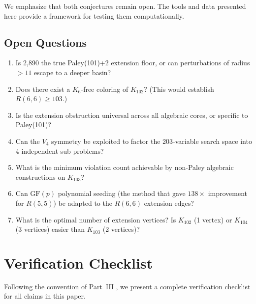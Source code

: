 \documentclass[11pt,a4paper]{article}
\theoremstyle{plain}
\theoremstyle{remark}
\newcommand{\GF}{\mathrm{GF}}
\begin{document}
We emphasize that both conjectures remain open. The tools and
data presented here provide a framework for testing them
computationally.

\subsection{Open Questions}

\begin{enumerate}[leftmargin=2em]
  \item Is 2{,}890 the true Paley(101)+2 extension floor, or can
    perturbations of radius $> 11$ escape to a deeper basin?
  \item Does there exist a $K_6$-free coloring of $K_{102}$?
    (This would establish $R(6,6) \geq 103$.)
  \item Is the extension obstruction universal across all
    algebraic cores, or specific to Paley(101)?
  \item Can the $V_4$ symmetry be exploited to factor the
    203-variable search space into 4 independent sub-problems?
  \item What is the minimum violation count achievable by
    non-Paley algebraic constructions on $K_{103}$?
  \item Can $\GF(p)$ polynomial seeding (the method that gave
    $138\times$ improvement for $R(5,5)$) be adapted to the
    $R(6,6)$ extension edges?
  \item What is the optimal number of extension vertices?
    Is $K_{102}$ (1 vertex) or $K_{104}$ (3 vertices) easier
    than $K_{103}$ (2 vertices)?
\end{enumerate}

\section{Verification Checklist}
\label{sec:verification}

Following the convention of Part~III \cite{daugherty2026gfp}, we
present a complete verification checklist for all claims in this paper.
\end{document}
